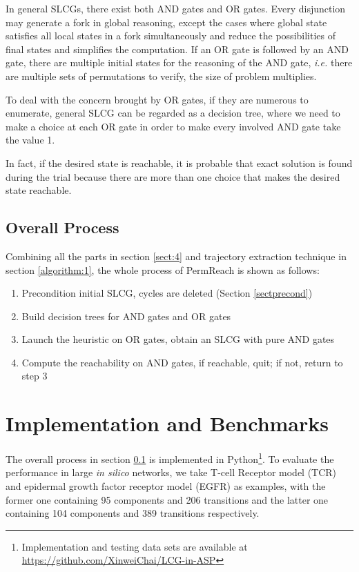 \documentclass[runningheads]{llncs}
\begin{document}
In general SLCGs, there exist both AND gates and OR gates. 
Every disjunction may generate a fork in global reasoning, except the cases where global state satisfies all local states in a fork simultaneously and reduce the possibilities of final states and simplifies the computation. If an OR gate is followed by an AND gate, there are multiple initial states for the reasoning of the AND gate, \textit{i.e.} there are multiple sets of permutations to verify, the size of problem multiplies. 

To deal with the concern brought by OR gates, if they are numerous %
to enumerate, general SLCG can be regarded as a decision tree, where we need to make a choice at each OR gate in order to make every involved AND gate take the value 1. 

In fact, if the desired state is reachable, it is probable that exact solution is found during the trial because there are more than one choice that makes the desired state reachable.

\subsection{Overall Process}\label{sectOverall}
Combining all the parts in section \ref{sect:4} and trajectory extraction technique in section \ref{algorithm:1}, the whole process of PermReach is shown as follows:
\begin{enumerate}
\item Precondition initial SLCG, cycles are deleted (Section \ref{sectprecond})
\item Build decision trees for AND gates and OR gates
\item Launch the heuristic on OR gates, obtain an SLCG with pure AND gates 
\item Compute the reachability on AND gates, if reachable, quit; if not, return to step 3 
\end{enumerate}

\section{Implementation and Benchmarks}\label{sect:5}
The overall process in section \ref{sectOverall} is implemented in Python\footnote{Implementation and testing data sets are available at \url{https://github.com/XinweiChai/LCG-in-ASP}}. 
To evaluate the performance in large \textit{in silico} networks, we take T-cell Receptor model (TCR) \cite{saez2007logical} and epidermal growth factor receptor model (EGFR) \cite{samaga2009logic} as examples, with the former one containing 95 components and 206 transitions and the latter one containing 104 components and 389 transitions respectively. 
\end{document}
